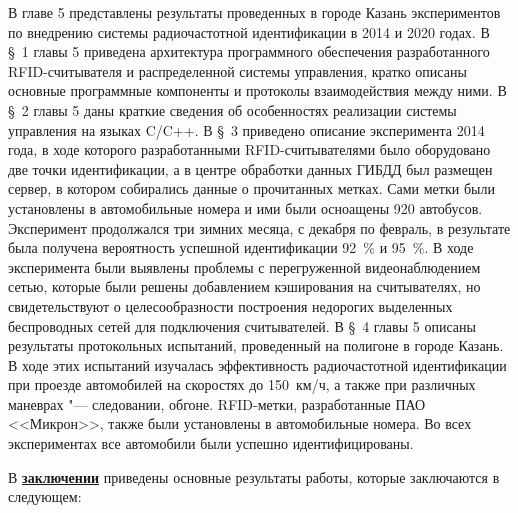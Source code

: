 В главе 5 представлены результаты проведенных в городе Казань экспериментов по внедрению системы радиочастотной идентификации в 2014 и 2020 годах. В \S~1 главы 5 приведена архитектура программного обеспечения разработанного RFID-считывателя и распределенной системы управления, кратко описаны основные программные компоненты и протоколы взаимодействия между ними. В \S~2 главы 5 даны краткие сведения об особенностях реализации системы управления на языках C/C++. В \S~3 приведено описание эксперимента 2014 года, в ходе которого разработанными RFID-считывателями было оборудовано две точки идентификации, а в центре обработки данных ГИБДД был размещен сервер, в котором собирались данные о прочитанных метках. Сами метки были установлены в автомобильные номера и ими были осноащены 920 автобусов. Эксперимент продолжался три зимних месяца, с декабря по февраль, в результате была получена вероятность успешной идентификации 92~\% и 95~\%. В ходе эксперимента были выявлены проблемы с перегруженной видеонаблюдением сетью, которые были решены добавлением кэширования на считывателях, но свидетельствуют о целесообразности построения недорогих выделенных беспроводных сетей для подключения считывателей. В \S~4 главы 5 описаны результаты протокольных испытаний, проведенный на полигоне в городе Казань. В ходе этих испытаний изучалась эффективность радиочастотной идентификации при проезде автомобилей на скоростях до 150~км/ч, а также при различных маневрах "--- следовании, обгоне. RFID-метки, разработанные ПАО <<Микрон>>, также были установлены в автомобильные номера. Во всех экспериментах все автомобили были успешно идентифицированы.

\FloatBarrier
{}                                  %
В \underline{\textbf{заключении}} приведены основные результаты работы, которые заключаются в следующем:



